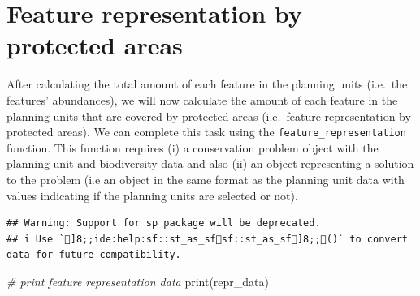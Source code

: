 \documentclass[
  12pt,
]{book}
\newenvironment{Shaded}{\begin{snugshade}}{\end{snugshade}}
\newcommand{\CommentTok}[1]{\textcolor[rgb]{0.56,0.35,0.01}{\textit{#1}}}
\newcommand{\FunctionTok}[1]{\textcolor[rgb]{0.00,0.00,0.00}{#1}}
\newcommand{\NormalTok}[1]{#1}
\newcommand{\OtherTok}[1]{\textcolor[rgb]{0.56,0.35,0.01}{#1}}
\newcommand{\SpecialCharTok}[1]{\textcolor[rgb]{0.00,0.00,0.00}{#1}}
\newcommand{\StringTok}[1]{\textcolor[rgb]{0.31,0.60,0.02}{#1}}
\begin{document}
\hypertarget{feature-representation-by-protected-areas}{%
\section{Feature representation by protected areas}\label{feature-representation-by-protected-areas}}

After calculating the total amount of each feature in the planning units (i.e.~the features' abundances), we will now calculate the amount of each feature in the planning units that are covered by protected areas (i.e.~feature representation by protected areas). We can complete this task using the \texttt{feature\_representation} function. This function requires (i) a conservation problem object with the planning unit and biodiversity data and also (ii) an object representing a solution to the problem (i.e an object in the same format as the planning unit data with values indicating if the planning units are selected or not).

\begin{Shaded}
\end{Shaded}

\begin{verbatim}
## Warning: Support for sp package will be deprecated.
## i Use `]8;;ide:help:sf::st_as_sfsf::st_as_sf]8;;()` to convert data for future compatibility.
\end{verbatim}

\begin{Shaded}
\begin{Highlighting}[]
\CommentTok{\# print feature representation data}
\FunctionTok{print}\NormalTok{(repr\_data)}
\end{Highlighting}
\end{Shaded}
\end{document}
